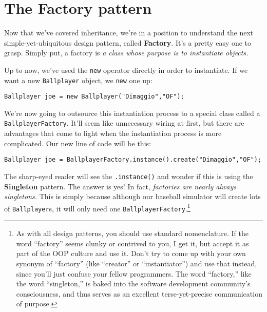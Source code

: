 
\chapter{The Factory pattern}

Now that we've covered inheritance, we're in a position to understand the next
simple-yet-ubiquitous design pattern, called \textbf{Factory}. It's a pretty
easy one to grasp. Simply put, a factory is \textit{a class whose purpose is
to instantiate objects.}

Up to now, we've used the \texttt{new} operator directly in order to
instantiate. If we want a new \texttt{Ballplayer} object, we \texttt{new} one
up:

\begin{Verbatim}[fontsize=\small,samepage=true,frame=none]
  Ballplayer joe = new Ballplayer("Dimaggio","OF");
\end{Verbatim}

We're now going to outsource this instantiation process to a special class
called a \texttt{BallplayerFactory}. It'll seem like unnecessary wiring at
first, but there are advantages that come to light when the instantiation
process is more complicated. Our new line of code will be this:

\begin{Verbatim}[fontsize=\small,samepage=true,frame=none]
  Ballplayer joe = BallplayerFactory.instance().create("Dimaggio","OF");
\end{Verbatim}

The sharp-eyed reader will see the \texttt{.instance()} and wonder if this is
using the \textbf{Singleton} pattern. The answer is yes! In fact,
\textit{factories are nearly always singletons.} This is simply because
although our baseball simulator will create lots of \texttt{Ballplayer}s, it
will only need one \texttt{BallplayerFactory}.\footnote{As with all design
patterns, you should use standard nomenclature. If the word ``factory'' seems
clunky or contrived to you, I get it, but accept it as part of the OOP culture
and use it. Don't try to come up with your own synonym of ``factory'' (like
``creator'' or ``instantiator'') and use that instead, since you'll just confuse
your fellow programmers. The word ``factory,'' like the word ``singleton,'' is
baked into the software development community's consciousness, and thus serves
as an excellent terse-yet-precise communication of purpose.}

